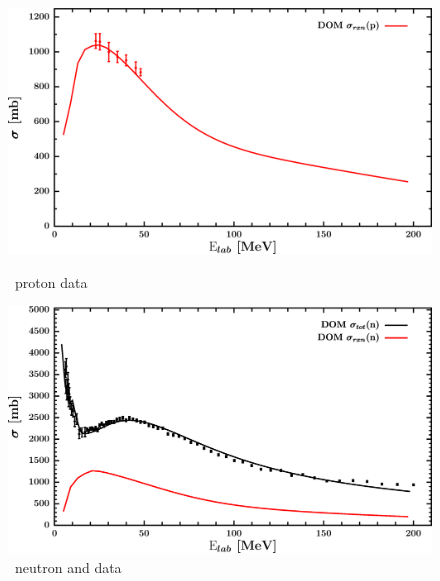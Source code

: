 \begin{figure}[H]
    \centering
    \begin{minipage}{0.45\textwidth}
        \centering
        \includegraphics[width=1.0\textwidth]{figures/ca48_protonInelastic.png}
        \caption{\caEight\ proton \rxn data}
        \label{DOMFitData_ca48_proton_inelastic}
    \end{minipage}\hfill
    \begin{minipage}{0.45\textwidth}
        \centering
        \includegraphics[width=1.0\textwidth]{figures/ca48_neutronInelastic.png}
        \caption{\caEight\ neutron \rxn and \tot data}
        \label{DOMFitData_ca48_neutron_inelastic}
    \end{minipage}
\end{figure}

\afterpage{\clearpage}

